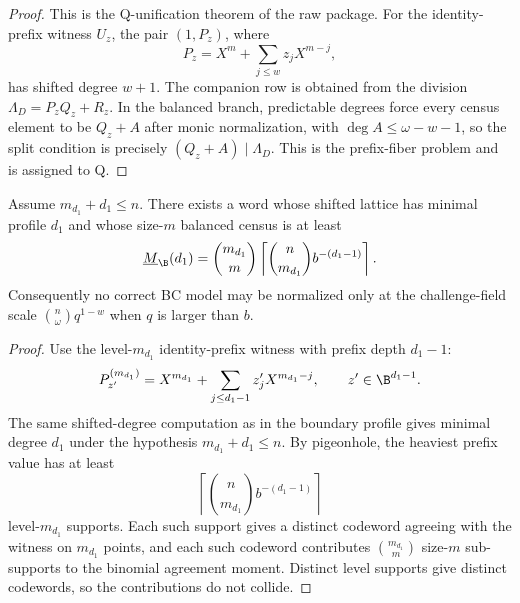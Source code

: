\begin{proof}
This is the Q-unification theorem of the raw package.  For the identity-prefix
witness \(U_z\), the pair \((1,P_z)\), where
\[
        P_z=X^m+\sum_{j\le w}z_jX^{m-j},
\]
has shifted degree \(w+1\).  The companion row is obtained from the division
\(\Lambda_D=P_zQ_z+R_z\).  In the balanced branch, predictable degrees force
every census element to be \(Q_z+A\) after monic normalization, with
\(\deg A\le\omega-w-1\), so the split condition is precisely
\((Q_z+A)\mid\Lambda_D\).  This is the prefix-fiber problem and is assigned to
Q.
\end{proof}

\begin{proposition}
\label{prop:gf-bc-base-floor}
Assume \(m_{d_1}+d_1\le n\).  There exists a word whose shifted lattice has
minimal profile \(d_1\) and whose size-\(m\) balanced census is at least
\[
        \underline M_{\B}(d_1)
        =
        \binom{m_{d_1}}m
        \left\lceil \binom n{m_{d_1}} b^{-(d_1-1)}\right\rceil .
\]
Consequently no correct BC model may be normalized only at the challenge-field
scale \(\binom n\omega q^{1-w}\) when \(q\) is larger than \(b\).
\end{proposition}

\begin{proof}
Use the level-\(m_{d_1}\) identity-prefix witness with prefix depth
\(d_1-1\):
\[
        P_{z'}^{(m_{d_1})}
        =
        X^{m_{d_1}}+\sum_{j\le d_1-1} z'_j X^{m_{d_1}-j},
        \qquad z'\in\B^{d_1-1}.
\]
The same shifted-degree computation as in the boundary profile gives minimal
degree \(d_1\) under the hypothesis \(m_{d_1}+d_1\le n\).  By pigeonhole, the
heaviest prefix value has at least
\[
        \left\lceil \binom n{m_{d_1}} b^{-(d_1-1)}\right\rceil
\]
level-\(m_{d_1}\) supports.  Each such support gives a distinct codeword
agreeing with the witness on \(m_{d_1}\) points, and each such codeword
contributes \(\binom{m_{d_1}}m\) size-\(m\) sub-supports to the binomial
agreement moment.  Distinct level supports give distinct codewords, so the
contributions do not collide.
\end{proof}

